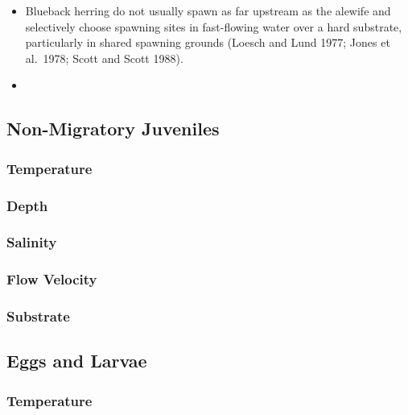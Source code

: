 \documentclass[
]{book}
\begin{document}
\begin{itemize}
\item
  Blueback herring do not usually spawn as far upstream as the alewife and selectively choose spawning sites in fast-flowing water over a hard substrate, particularly in shared spawning grounds (Loesch and Lund 1977; Jones et al.~1978; Scott and Scott 1988).
\item
\end{itemize}

\hypertarget{non-migratory-juveniles-2}{%
\subsection{Non-Migratory Juveniles}\label{non-migratory-juveniles-2}}

\hypertarget{temperature-7}{%
\subsubsection{Temperature}\label{temperature-7}}

\hypertarget{depth-7}{%
\subsubsection{Depth}\label{depth-7}}

\hypertarget{salinity-7}{%
\subsubsection{Salinity}\label{salinity-7}}

\hypertarget{flow-velocity-7}{%
\subsubsection{Flow Velocity}\label{flow-velocity-7}}

\hypertarget{substrate-7}{%
\subsubsection{Substrate}\label{substrate-7}}

\hypertarget{eggs-and-larvae}{%
\subsection{Eggs and Larvae}\label{eggs-and-larvae}}

\hypertarget{temperature-8}{%
\subsubsection{Temperature}\label{temperature-8}}
\end{document}

